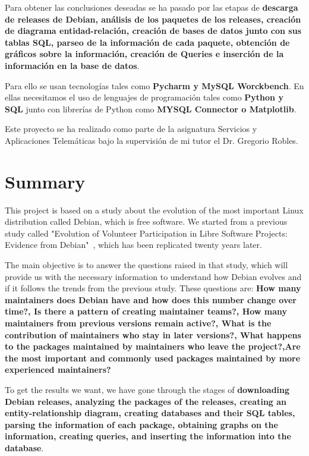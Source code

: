 \documentclass[a4paper, 12pt]{book}
\begin{document}
Para obtener las conclusiones deseadas se ha pasado por las etapas de \textbf {descarga de releases de Debian, análisis de los paquetes de los releases, creación de diagrama entidad-relación, creación de bases de datos junto con sus tablas SQL, parseo de la información de cada paquete, obtención de gráficos sobre la información, creación de Queries e inserción de la información en la base de datos}.

Para ello se usan tecnologías tales como \textbf {Pycharm y MySQL Worckbench}.
En ellas necesitamos el uso de lenguajes de programación tales como \textbf {Python y SQL} junto con librerías de Python como \textbf {MYSQL Connector o Matplotlib}.

Este proyecto se ha realizado como parte de la asignatura Servicios y Aplicaciones Telemáticas bajo la supervisión de mi tutor el Dr. Gregorio Robles.



\chapter*{Summary}
This project is based on a study about the evolution of the most important Linux distribution called Debian, which is free software. We started from a previous study called "Evolution of Volunteer Participation in Libre Software Projects: Evidence from Debian"~\cite{robles05:_debian}, which has been replicated twenty years later.

The main objective is to answer the questions raised in that study, which will provide us with the necessary information to understand how Debian evolves and if it follows the trends from the previous study.
These questions are: \textbf{How many maintainers does Debian have and how does this number change over time?, Is there a pattern of creating maintainer teams?, How many maintainers from previous versions remain active?, What is the contribution of maintainers who stay in later versions?, What happens to the packages maintained by maintainers who leave the project?,Are the most important and commonly used packages maintained by more experienced maintainers?}

To get the results we want, we have gone through the stages of \textbf{downloading Debian releases, analyzing the packages of the releases, creating an entity-relationship diagram, creating databases and their SQL tables, parsing the information of each package, obtaining graphs on the information, creating queries, and inserting the information into the database}.
\end{document}
